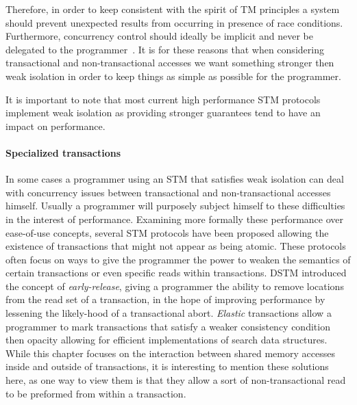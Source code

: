 Therefore, in order  to keep consistent with  the spirit of TM  principles a
system should prevent unexpected   results  from   occurring  
in presence of  race conditions. 
Furthermore, concurrency   control should  ideally be implicit  
and never be delegated to  the programmer~\cite{CIR11,MS12}.
It is for these reasons that when considering transactional and non-transactional accesses
we want something stronger then weak isolation in order to keep things
as simple as possible for the programmer.

It is important to note that most current high performance STM protocols implement weak isolation
as providing stronger guarantees tend to have an impact on performance.



\paragraph{Specialized transactions}
In some cases a programmer using an STM that satisfies
weak isolation can deal with concurrency issues between transactional
and non-transactional accesses himself.
Usually a programmer will purposely subject himself to these
difficulties in the interest of performance.
Examining more formally these performance over ease-of-use concepts, several
STM protocols have been proposed allowing the existence of transactions
that might not appear as being atomic.
These protocols often focus on ways to give the programmer the power to weaken the semantics
of certain transactions or even specific reads within transactions.
DSTM \cite{HLMS03} introduced the concept of \emph{early-release}, giving a programmer
the ability to remove locations from the read set of a transaction,
in the hope of improving performance by lessening the likely-hood of a
transactional abort.
\emph{Elastic} transactions \cite{FGG09} allow a programmer to mark transactions that
satisfy a weaker consistency condition then opacity allowing for efficient
implementations of search data structures.
While this chapter focuses on the interaction between shared memory accesses
inside and outside of transactions, it is interesting to mention
these solutions here, as one way to view them is that they allow a sort of non-transactional read
to be preformed from within a transaction.

